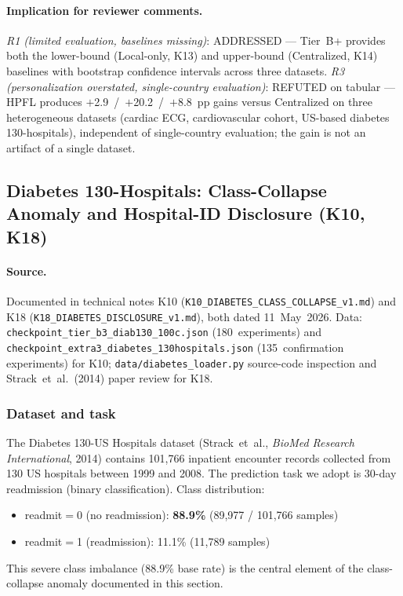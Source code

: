 \documentclass[conference]{IEEEtran}
\begin{document}
\paragraph{Implication for reviewer comments.} \emph{R1 (limited evaluation, baselines missing)}: ADDRESSED --- Tier~B+ provides both the lower-bound (Local-only, K13) and upper-bound (Centralized, K14) baselines with bootstrap confidence intervals across three datasets. \emph{R3 (personalization overstated, single-country evaluation)}: REFUTED on tabular --- HPFL produces $+$2.9~/~$+$20.2~/~$+$8.8~pp gains versus Centralized on three heterogeneous datasets (cardiac ECG, cardiovascular cohort, US-based diabetes 130-hospitals), independent of single-country evaluation; the gain is not an artifact of a single dataset.

\subsection{Diabetes 130-Hospitals: Class-Collapse Anomaly and Hospital-ID Disclosure (K10, K18)}
\label{sec:tier_b_diab_collapse}

\paragraph{Source.} Documented in technical notes K10 (\texttt{K10\_DIABETES\_CLASS\_COLLAPSE\_v1.md}) and K18 (\texttt{K18\_DIABETES\_DISCLOSURE\_v1.md}), both dated 11~May~2026. Data: \texttt{checkpoint\_tier\_b3\_diab130\_100c.json} (180~experiments) and \texttt{checkpoint\_extra3\_diabetes\_130hospitals.json} (135~confirmation experiments) for K10; \texttt{data/diabetes\_loader.py} source-code inspection and Strack~et~al.~(2014) paper review for K18.

\subsubsection*{Dataset and task}

The Diabetes 130-US Hospitals dataset (Strack~et~al., \emph{BioMed Research International}, 2014) contains 101{,}766 inpatient encounter records collected from 130 US hospitals between 1999 and 2008. The prediction task we adopt is 30-day readmission (binary classification). Class distribution:
\begin{itemize}
\item readmit$=$0 (no readmission): \textbf{88.9\%} (89{,}977 / 101{,}766 samples)
\item readmit$=$1 (readmission): 11.1\% (11{,}789 samples)
\end{itemize}
This severe class imbalance (88.9\% base rate) is the central element of the class-collapse anomaly documented in this section.
\end{document}
